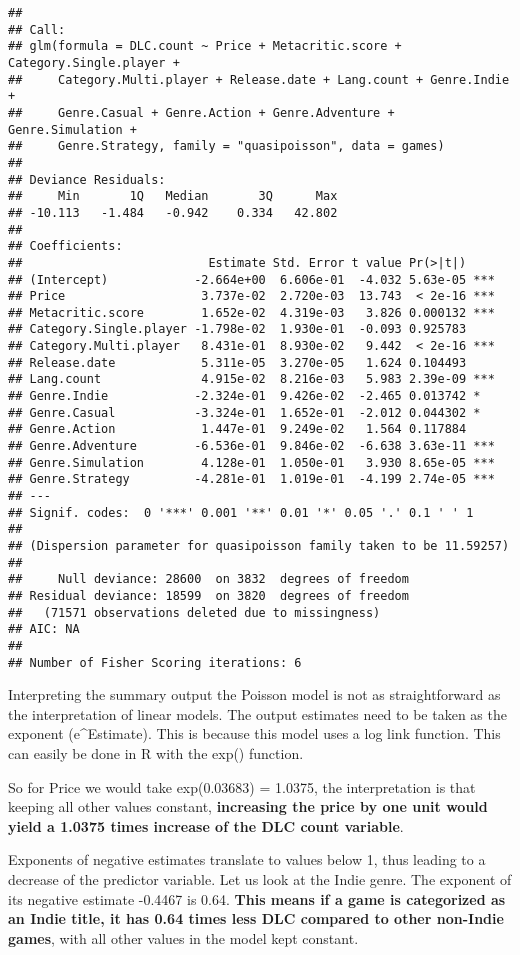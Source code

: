 \documentclass[
]{article}
\begin{document}
\begin{verbatim}
## 
## Call:
## glm(formula = DLC.count ~ Price + Metacritic.score + Category.Single.player + 
##     Category.Multi.player + Release.date + Lang.count + Genre.Indie + 
##     Genre.Casual + Genre.Action + Genre.Adventure + Genre.Simulation + 
##     Genre.Strategy, family = "quasipoisson", data = games)
## 
## Deviance Residuals: 
##     Min       1Q   Median       3Q      Max  
## -10.113   -1.484   -0.942    0.334   42.802  
## 
## Coefficients:
##                          Estimate Std. Error t value Pr(>|t|)    
## (Intercept)            -2.664e+00  6.606e-01  -4.032 5.63e-05 ***
## Price                   3.737e-02  2.720e-03  13.743  < 2e-16 ***
## Metacritic.score        1.652e-02  4.319e-03   3.826 0.000132 ***
## Category.Single.player -1.798e-02  1.930e-01  -0.093 0.925783    
## Category.Multi.player   8.431e-01  8.930e-02   9.442  < 2e-16 ***
## Release.date            5.311e-05  3.270e-05   1.624 0.104493    
## Lang.count              4.915e-02  8.216e-03   5.983 2.39e-09 ***
## Genre.Indie            -2.324e-01  9.426e-02  -2.465 0.013742 *  
## Genre.Casual           -3.324e-01  1.652e-01  -2.012 0.044302 *  
## Genre.Action            1.447e-01  9.249e-02   1.564 0.117884    
## Genre.Adventure        -6.536e-01  9.846e-02  -6.638 3.63e-11 ***
## Genre.Simulation        4.128e-01  1.050e-01   3.930 8.65e-05 ***
## Genre.Strategy         -4.281e-01  1.019e-01  -4.199 2.74e-05 ***
## ---
## Signif. codes:  0 '***' 0.001 '**' 0.01 '*' 0.05 '.' 0.1 ' ' 1
## 
## (Dispersion parameter for quasipoisson family taken to be 11.59257)
## 
##     Null deviance: 28600  on 3832  degrees of freedom
## Residual deviance: 18599  on 3820  degrees of freedom
##   (71571 observations deleted due to missingness)
## AIC: NA
## 
## Number of Fisher Scoring iterations: 6
\end{verbatim}

Interpreting the summary output the Poisson model is not as
straightforward as the interpretation of linear models. The output
estimates need to be taken as the exponent (e\^{}Estimate). This is
because this model uses a log link function. This can easily be done in
R with the exp() function.

So for Price we would take exp(0.03683) = 1.0375, the interpretation is
that keeping all other values constant, \textbf{increasing the price by
one unit would yield a 1.0375 times increase of the DLC count variable}.

Exponents of negative estimates translate to values below 1, thus
leading to a decrease of the predictor variable. Let us look at the
Indie genre. The exponent of its negative estimate -0.4467 is 0.64.
\textbf{This means if a game is categorized as an Indie title, it has
0.64 times less DLC compared to other non-Indie games}, with all other
values in the model kept constant.
\end{document}
